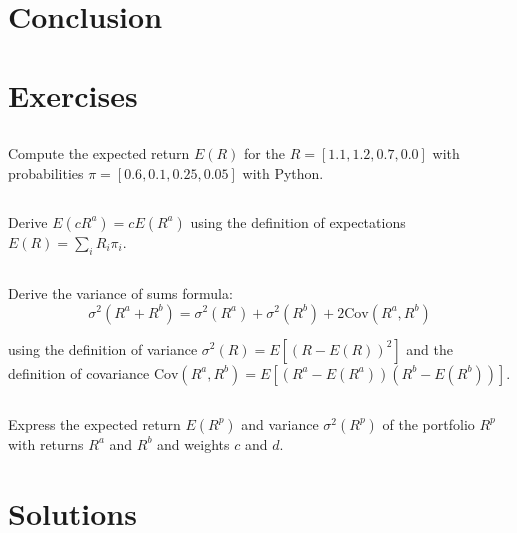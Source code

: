 \section{Conclusion}

\newpage
\section{Exercises}

\subsection{}

Compute the expected return $E(R)$ for the 
$R = [1.1, 1.2, 0.7, 0.0]$ with probabilities
$\pi = [0.6, 0.1, 0.25, 0.05]$ with Python.

\subsection{}

Derive $E(cR^a) = cE(R^a)$ using the 
definition of expectations $E(R) = \sum_i R_i \pi_i$.

\subsection{}

Derive the variance of sums formula:
\begin{equation}
    \sigma^2(R^a + R^b) = \sigma^2(R^a) + \sigma^2(R^b) + 2\text{Cov}(R^a, R^b)
\end{equation}

using the definition of variance $\sigma^2(R) = E[(R - E(R))^2]$ and
the definition of covariance $\text{Cov}(R^a, R^b) = E[(R^a - E(R^a))(R^b - E(R^b))]$.



\subsection{}

Express the expected return $E(R^p)$ 
and variance $\sigma^2(R^p)$ of the
portfolio $R^p$ with returns $R^a$ and $R^b$
and weights $c$ and $d$.

\newpage
\section{Solutions}

\subsection{}

